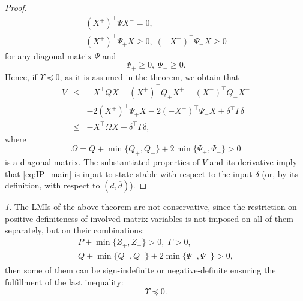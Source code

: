 \documentclass[twocolumn,english]{IEEEtran}
\theoremstyle{plain}
\theoremstyle{definition}
\theoremstyle{plain}
\theoremstyle{plain}
\theoremstyle{remark}
\newtheorem{rem}{\protect\remarkname}
\providecommand{\remarkname}{Remark}
\begin{document}
\begin{proof}
\begin{gather*}
(X^{+})^{\top}\Psi X^{-}=0,\\
(X^{+})^{\top}\Psi_{+}X\geq0,\;(-X^{-})^{\top}\Psi_{-}X\geq0
\end{gather*}
for any diagonal matrix $\Psi$ and
\[
\Psi_{+}\geq0,\;\Psi_{-}\geq0.
\]
Hence, if $\Upsilon\preceq0$, as it is assumed in the theorem, we obtain that
\begin{eqnarray*}
\dot{V} & \leq & -X^{\top}QX-(X^{+})^{\top}Q_{+}X^{+}-(X^{-})^{\top}Q_{-}X^{-}\\
 &  & -2(X^{+})^{\top}\Psi_{+}X-2(-X^{-})^{\top}\Psi_{-}X+\delta^{\top}\Gamma\delta\\
 & \leq & -X^{\top}\Omega X+\delta^{\top}\Gamma\delta,
\end{eqnarray*}
where
\[
\Omega=Q+\min\{Q_{+},Q_{-}\}+2\min\{\Psi_{+},\Psi_{-}\}>0
\]
is a diagonal matrix. The substantiated properties of $V$ and its derivative imply that \eqref{eq:IP_main} is input-to-state stable \cite{Khalil2002} with respect to the input $\delta$ (or, by its definition, with respect to $(\underline{d},\overline{d})$).
\end{proof}
\begin{rem}
The LMIs of the above theorem are not conservative, since the restriction on positive definiteness of involved matrix variables is not imposed on all of them separately, but on their combinations:
\begin{gather*}
P+\min\{Z_{+},Z_{-}\}>0,\;\Gamma>0,\\
Q+\min\{Q_{+},Q_{-}\}+2\min\{\Psi_{+},\Psi_{-}\}>0,
\end{gather*}
then some of them can be sign-indefinite or negative-definite ensuring the fulfillment of the last inequality:
\[
\Upsilon\preceq0.
\]
\end{rem}
\end{document}
